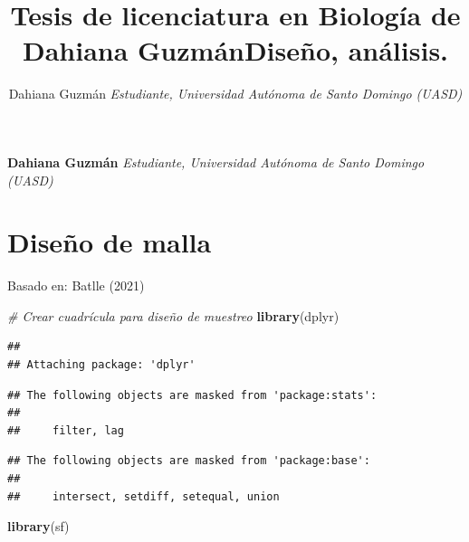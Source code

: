 \documentclass[11pt,]{article}
\title{Tesis de licenciatura en Biología de Dahiana GuzmánDiseño, análisis.  }
\author{\Large Dahiana Guzmán\vspace{0.05in} \newline\normalsize\emph{Estudiante, Universidad Autónoma de Santo Domingo (UASD)}  }
\date{}
\newcommand*{\authorfont}{\fontfamily{phv}\selectfont}
\newenvironment{Shaded}{\begin{snugshade}}{\end{snugshade}}
\newcommand{\CommentTok}[1]{\textcolor[rgb]{0.56,0.35,0.01}{\textit{#1}}}
\newcommand{\KeywordTok}[1]{\textcolor[rgb]{0.13,0.29,0.53}{\textbf{#1}}}
\newcommand{\NormalTok}[1]{#1}
\begin{document}
	
%

{%
\setlength{\parindent}{0pt}
\thispagestyle{plain}
{\fontsize{18}{20}\selectfont\raggedright 
\maketitle  %

}

{
   \vskip 13.5pt\relax \normalsize\fontsize{11}{12} 
\textbf{\authorfont Dahiana Guzmán} \hskip 15pt \emph{\small Estudiante, Universidad Autónoma de Santo Domingo (UASD)}   

}

}






\vskip 6.5pt


\noindent  \hypertarget{diseuxf1o-de-malla}{%
\section{Diseño de malla}\label{diseuxf1o-de-malla}}

Basado en: Batlle (2021)

\begin{Shaded}
\begin{Highlighting}[]
\CommentTok{# Crear cuadrícula para diseño de muestreo}
\KeywordTok{library}\NormalTok{(dplyr)}
\end{Highlighting}
\end{Shaded}

\begin{verbatim}
## 
## Attaching package: 'dplyr'
\end{verbatim}

\begin{verbatim}
## The following objects are masked from 'package:stats':
## 
##     filter, lag
\end{verbatim}

\begin{verbatim}
## The following objects are masked from 'package:base':
## 
##     intersect, setdiff, setequal, union
\end{verbatim}

\begin{Shaded}
\begin{Highlighting}[]
\KeywordTok{library}\NormalTok{(sf)}
\end{Highlighting}
\end{Shaded}
\end{document}
